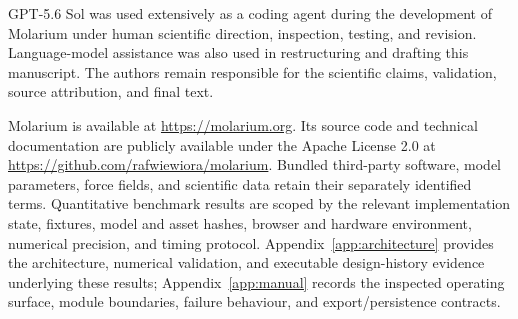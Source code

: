 \documentclass[11pt]{article}
\begin{document}
GPT-5.6 Sol was used extensively as a coding agent during the development of Molarium under human scientific direction, inspection, testing, and revision. Language-model assistance was also used in restructuring and drafting this manuscript. The authors remain responsible for the scientific claims, validation, source attribution, and final text.

Molarium is available at \url{https://molarium.org}. Its source code and technical documentation are publicly available under the Apache License 2.0 at \url{https://github.com/rafwiewiora/molarium}. Bundled third-party software, model parameters, force fields, and scientific data retain their separately identified terms. Quantitative benchmark results are scoped by the relevant implementation state, fixtures, model and asset hashes, browser and hardware environment, numerical precision, and timing protocol. Appendix~\ref{app:architecture} provides the architecture, numerical validation, and executable design-history evidence underlying these results; Appendix~\ref{app:manual} records the inspected operating surface, module boundaries, failure behaviour, and export/persistence contracts.

\appendix
\end{document}
